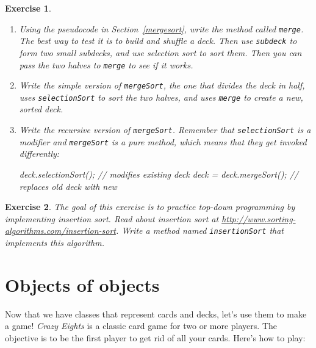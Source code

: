 \documentclass[12pt]{book}
\theoremstyle{exercise}
\newtheorem{exercise}{Exercise}[chapter]
\newcommand{\java}[1]{\verb"#1"}
\newcommand{\java}[1]{\lstinline{#1}} %
\begin{document}
\begin{exercise}
\begin{enumerate}
\item Using the pseudocode in Section~\ref{mergesort}, write the method called \java{merge}.
The best way to test it is to build and shuffle a deck.
Then use \java{subdeck} to form two small subdecks, and use selection sort to sort them.
Then you can pass the two halves to \java{merge} to see if it works.

\item Write the simple version of \java{mergeSort}, the one that divides the deck in half, uses \java{selectionSort} to sort the two halves, and uses \java{merge} to create a new, sorted deck.

\item Write the recursive version of \java{mergeSort}.
Remember that \java{selectionSort} is a modifier and \java{mergeSort} is a pure method, which means that they get invoked differently:

\begin{code}
deck.selectionSort();         // modifies existing deck
deck = deck.mergeSort();      // replaces old deck with new
\end{code}

\end{enumerate}
\end{exercise}


\begin{exercise}
The goal of this exercise is to practice top-down programming by
implementing insertion sort.
Read about insertion sort at \url{http://www.sorting-algorithms.com/insertion-sort}.
Write a method named \java{insertionSort} that implements this algorithm.
\end{exercise}


\chapter{Objects of objects}
\label{eights}


Now that we have classes that represent cards and decks, let's use them to make a game!
{\it Crazy Eights} is a classic card game for two or more players.
The objective is to be the first player to get rid of all your cards.
Here's how to play:

\end{document}
